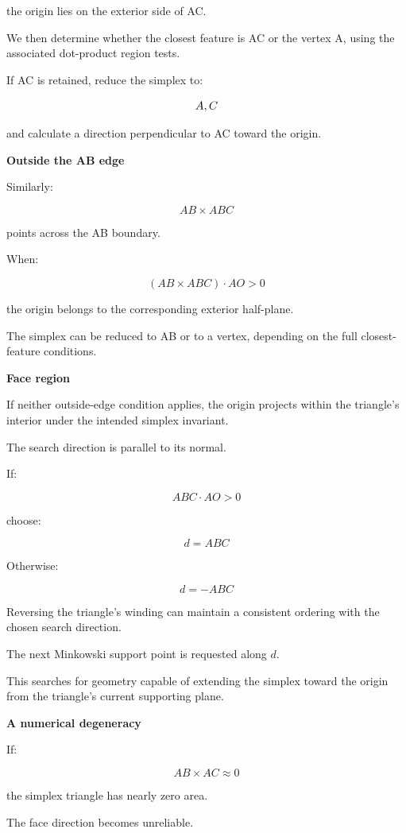 the origin lies on the exterior side of AC.

We then determine whether the closest feature is AC or the vertex A, using the associated dot-product region tests.

If AC is retained, reduce the simplex to:

\[
\\{A,C\\}
\]

and calculate a direction perpendicular to AC toward the origin.

\textbf{Outside the AB edge}

Similarly:

\[
AB\times ABC
\]

points across the AB boundary.

When:

\[
\boxed{ (AB\times ABC)\cdot AO>0 }
\]

the origin belongs to the corresponding exterior half-plane.

The simplex can be reduced to AB or to a vertex, depending on the full closest-feature conditions.

\textbf{Face region}

If neither outside-edge condition applies, the origin projects within the triangle's interior under the intended simplex invariant.

The search direction is parallel to its normal.

If:

\[
ABC\cdot AO>0
\]

choose:

\[
\boxed{d=ABC}
\]

Otherwise:

\[
\boxed{d=-ABC}
\]

Reversing the triangle's winding can maintain a consistent ordering with the chosen search direction.

The next Minkowski support point is requested along \(d\).

This searches for geometry capable of extending the simplex toward the origin from the triangle's current supporting plane.

\textbf{A numerical degeneracy}

If:

\[
AB\times AC\approx0
\]

the simplex triangle has nearly zero area.

The face direction becomes unreliable.

